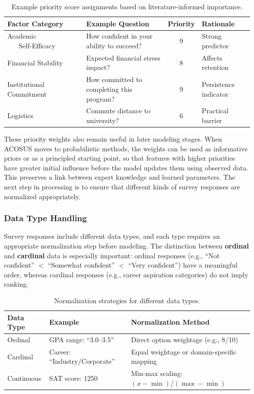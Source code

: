 \documentclass[letterpaper,11pt]{article}
\begin{document}
\begin{table}[htbp]
\centering
\caption{Example priority score assignments based on literature-informed importance.}
\label{tab:priority}
\begin{tabular}{@{}p{3.1cm}p{4.5cm}cp{3.5cm}@{}}
\toprule
\textbf{Factor Category} & \textbf{Example Question} & \textbf{Priority} & \textbf{Rationale} \\
\midrule
Academic ~ ~ ~ ~ ~ ~ ~ ~ ~ Self-Efficacy & How confident in your ability to succeed? & 9 & Strong predictor \parencite{bandura1997} \\
\midrule
Financial Stability & Expected financial stress impact? & 8 & Affects retention \parencite{socialcognitive2022} \\
\midrule
Institutional Commitment & How committed to completing this program? & 9 & Persistence indicator \parencite{tinto1993} \\
\midrule
Logistics & Commute distance to university? & 6 & Practical barrier \\
\bottomrule
\end{tabular}
\end{table}

These priority weights also remain useful in later modeling stages. When ACOSUS moves to probabilistic methods, the weights can be used as informative priors or as a principled starting point, so that features with higher priorities have greater initial influence before the model updates them using observed data. This preserves a link between expert knowledge and learned parameters. The next step in processing is to ensure that different kinds of survey responses are normalized appropriately.

\subsubsection{Data Type Handling}

Survey responses include different data types, and each type requires an appropriate normalization step before modeling. The distinction between \textbf{ordinal} and \textbf{cardinal} data is especially important: ordinal responses (e.g., ``Not confident'' $<$ ``Somewhat confident'' $<$ ``Very confident'') have a meaningful order, whereas cardinal responses (e.g., career aspiration categories) do not imply ranking.

\begin{table}[htbp]
\centering
\caption{Normalization strategies for different data types.}
\label{tab:normalization}
\begin{tabular}{@{}lll@{}}
\toprule
\textbf{Data Type} & \textbf{Example} & \textbf{Normalization Method} \\
\midrule
Ordinal & GPA range: ``3.0--3.5'' & Direct option weightage (e.g., 8/10) \\
Cardinal & Career: ``Industry/Corporate'' & Equal weightage or domain-specific mapping \\
Continuous & SAT score: 1250 & Min-max scaling: $(x - \min)/(\max - \min)$ \\
\bottomrule
\end{tabular}
\end{table}
\end{document}
